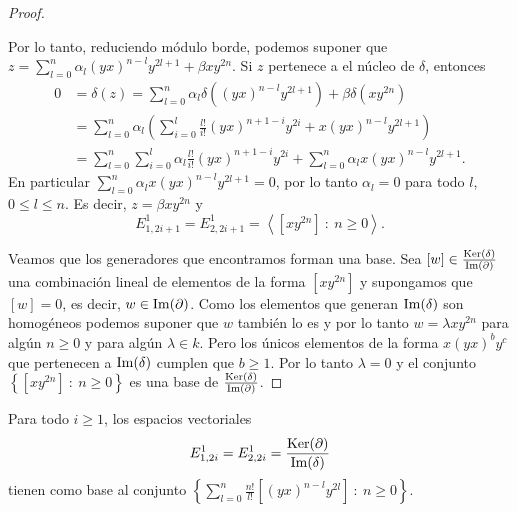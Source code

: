 \documentclass[fleqn,../tesis.tex]{subfiles}
\begin{document}
\begin{proof}
\begin{itemize}
		Por lo tanto, reduciendo módulo borde, podemos suponer que $z = \sum_{l = 0}^n\alpha_l(yx)^{n - l}y^{2l + 1} + \beta xy^{2n}$.
		Si $z$ pertenece a el núcleo de $\delta$, entonces
		\begin{align*}
			0 &= \delta(z) = \sum_{l = 0}^n\alpha_l\delta((yx)^{n - l}y^{2l + 1}) + \beta \delta(xy^{2n}) \\
			&= \sum_{l = 0}^n\alpha_l \left( \sum_{i = 0}^l\frac{l!}{i!}(yx)^{n + 1 - i}y^{2i} + x(yx)^{n - l}y^{2l + 1} \right) \\
			&= \sum_{l = 0}^n \sum_{i = 0}^l\alpha_l\frac{l!}{i!}(yx)^{n + 1 - i}y^{2i}
				+ \sum_{l = 0}^n\alpha_l x(yx)^{n - l}y^{2l + 1}.
		\end{align*}	
		En particular $\sum_{l = 0}^n\alpha_l x(yx)^{n - l}y^{2l + 1}  = 0$, por lo tanto $\alpha_l = 0$ para todo $l$, $0 \leq l \leq n$.
		Es decir, $z = \beta xy^{2n}$ y
		\[
			E_{1,2i + 1}^1 = E_{2, 2i + 1}^1 = \left\langle \left[xy^{2n}\right]\ :\ n \geq 0 \right\rangle.
		\]
	\end{itemize}
		Veamos que los generadores que encontramos forman una base. Sea $[w] \in \frac{\operatorname{Ker}(\delta)}{\operatorname{Im}(\partial)}$ una combinación
		lineal de elementos de la forma $[xy^{2n}]$ y supongamos que $[w] = 0$, es decir, $w \in \operatorname{Im}(\partial)$.
		Como los elementos que generan $\operatorname{Im}(\delta)$ son homogéneos podemos suponer que $w$ también lo es y por lo tanto $w = \lambda xy^{2n}$
		para algún $n \geq 0$ y para algún $\lambda \in k$.
		Pero los únicos elementos de la forma $x(yx)^by^c$ que pertenecen a $\operatorname{Im}(\delta)$ cumplen que $b \geq 1$.
		Por lo tanto $\lambda = 0$ y el conjunto $\left\{ [xy^{2n}] \ :\ n \geq 0\right\}$ es una base de $\frac{\operatorname{Ker}(\delta)}{\operatorname{Im}(\partial)}$.	 
\end{proof}
\begin{prop}
	Para todo $i \geq 1$, los espacios vectoriales
	\begin{align*}
		E_{1,2i}^1 = E_{2, 2i}^1 = \frac{\operatorname{Ker}(\partial)}{\operatorname{Im}(\delta)}
	\end{align*}
	tienen como base al conjunto $\left\{ \sum_{l = 0}^n \frac{n!}{l!}\left[(yx)^{n - l}y^{2l}\right] \ :\ n \geq 0\right\}$.
\end{prop}
\end{document}
